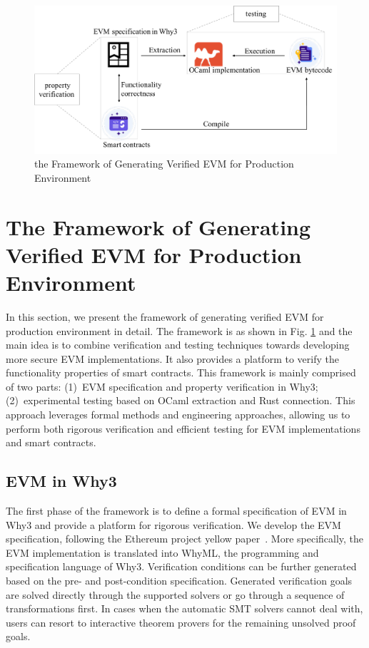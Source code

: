 \documentclass[runningheads]{llncs}
\begin{document}
\begin{figure}[t]
  \centering
  \includegraphics[scale=0.4]{framework.pdf}
  \caption{the Framework of Generating Verified EVM for Production Environment}
  \label{fig:evm1}
\end{figure}

\section{The Framework of Generating Verified EVM for Production Environment}\label{Sec: Framework}
In this section, we present the framework of generating verified EVM for production environment in detail. 
The framework is as shown in Fig. \ref{fig:evm1} and the main idea is to combine verification and testing techniques 
towards developing more secure EVM implementations.
It also provides a platform to verify the functionality properties of smart contracts.  
This framework is mainly comprised of two parts: (1)~EVM specification and property verification in Why3; (2)~experimental testing based on OCaml extraction and Rust connection. 
This approach leverages formal methods and engineering approaches, allowing us to perform 
both rigorous verification and efficient testing for EVM implementations and smart contracts. 

\subsection{EVM in Why3}
The first phase of the framework is to define a formal specification of EVM in Why3 
and provide a platform for rigorous verification.  
We develop the EVM specification, following the Ethereum project yellow paper~\cite{wood2014ethereum}. 
More specifically, the EVM implementation is translated into WhyML, 
the programming and specification language of Why3. %
Verification conditions can be further generated
based on the pre- and post-condition specification. 
Generated verification goals are solved directly through the supported 
solvers or go through a sequence of transformations first. 
In cases when the automatic SMT solvers cannot deal with, 
users can resort to interactive theorem provers for the remaining unsolved proof goals.
\end{document}
